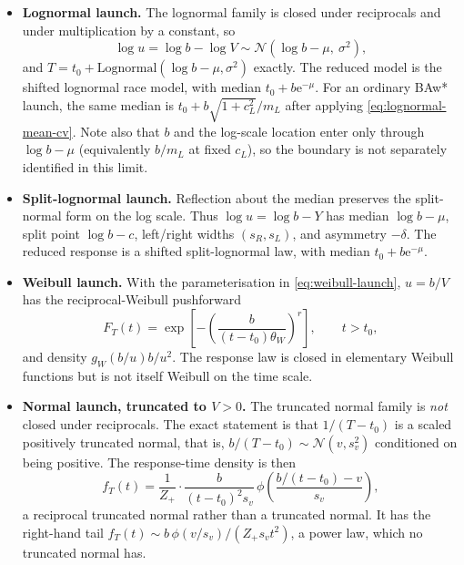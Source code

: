 \documentclass[12pt]{article}
\newcommand{\Normal}{\mathcal{N}}
\newcommand{\phiN}{\phi}
\newcommand{\e}{\mathrm{e}}
\theoremstyle{remark}
\begin{document}
\begin{itemize}
  \item \textbf{Lognormal launch.} The lognormal family is closed under reciprocals and under multiplication by a constant, so
        \begin{equation}
          \log u = \log b - \log V \sim \Normal\!\left(\log b - \mu,\ \sigma^2\right),
        \end{equation}
        and $T = t_0 + \mathrm{Lognormal}(\log b - \mu, \sigma^2)$ exactly. The reduced model is the shifted lognormal race model, with median $t_0 + b\e^{-\mu}$. For an ordinary BAw* launch, the same median is $t_0+b\sqrt{1+c_L^2}/m_L$ after applying
        \eqref{eq:lognormal-mean-cv}. Note also that $b$ and the log-scale
        location enter only through $\log b - \mu$ (equivalently $b/m_L$ at fixed $c_L$), so the boundary is not separately identified in this limit.
  \item \textbf{Split-lognormal launch.} Reflection about the median preserves the split-normal form on the log scale. Thus $\log u=\log b-Y$ has median $\log b-\mu$, split point $\log b-c$, left/right widths $(s_R,s_L)$, and asymmetry $-\delta$. The reduced response is a shifted split-lognormal law, with median $t_0+b\e^{-\mu}$.
  \item \textbf{Weibull launch.} With the parameterisation in
        \eqref{eq:weibull-launch}, $u=b/V$ has the reciprocal-Weibull
        pushforward
        \begin{equation}
          F_T(t)=\exp\!\left[-\left(\frac{b}{(t-t_0)\theta_W}\right)^r\right],
          \qquad t>t_0,
        \end{equation}
        and density $g_W(b/u)b/u^2$. The response law is closed in elementary Weibull functions but is not itself Weibull on the time scale.
  \item \textbf{Normal launch, truncated to $V>0$.} The truncated normal family is \emph{not} closed under reciprocals. The exact statement is that $1/(T - t_0)$ is a scaled positively truncated normal, that is, $b/(T-t_0) \sim \Normal(v, s_v^2)$ conditioned on being positive. The response-time density is then
        \begin{equation}
          f_T(t) = \frac{1}{Z_+}\cdot\frac{b}{(t-t_0)^2 s_v}\,
                   \phiN\!\left(\frac{b/(t-t_0) - v}{s_v}\right),
        \end{equation}
        a reciprocal truncated normal rather than a truncated normal. It has the right-hand tail $f_T(t) \sim b\,\phiN(v/s_v)/(Z_+ s_v t^2)$, a power law, which no truncated normal has.
\end{itemize}
\end{document}
